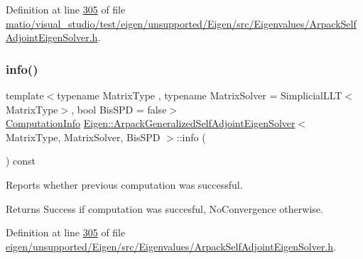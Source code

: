 Definition at line \hyperlink{matio_2visual__studio_2test_2eigen_2unsupported_2_eigen_2src_2_eigenvalues_2_arpack_self_adjoint_eigen_solver_8h_source_l00305}{305} of file \hyperlink{matio_2visual__studio_2test_2eigen_2unsupported_2_eigen_2src_2_eigenvalues_2_arpack_self_adjoint_eigen_solver_8h_source}{matio/visual\+\_\+studio/test/eigen/unsupported/\+Eigen/src/\+Eigenvalues/\+Arpack\+Self\+Adjoint\+Eigen\+Solver.\+h}.

\mbox{\label{class_eigen_1_1_arpack_generalized_self_adjoint_eigen_solver_a6f952eed50efe01b8cb91726e6a93b68}} 
\subsubsection{\texorpdfstring{info()}{info()}\hspace{0.1cm}{\footnotesize\ttfamily [2/2]}}
{\footnotesize\ttfamily template$<$typename Matrix\+Type , typename Matrix\+Solver  = Simplicial\+L\+L\+T$<$\+Matrix\+Type$>$, bool Bis\+S\+PD = false$>$ \\
\hyperlink{group__enums_ga85fad7b87587764e5cf6b513a9e0ee5e}{Computation\+Info} \hyperlink{class_eigen_1_1_arpack_generalized_self_adjoint_eigen_solver}{Eigen\+::\+Arpack\+Generalized\+Self\+Adjoint\+Eigen\+Solver}$<$ Matrix\+Type, Matrix\+Solver, Bis\+S\+PD $>$\+::info (\begin{DoxyParamCaption}{ }\end{DoxyParamCaption}) const\hspace{0.3cm}{\ttfamily [inline]}}



Reports whether previous computation was successful. 

\begin{DoxyReturn}{Returns}
{\ttfamily Success} if computation was succesful, {\ttfamily No\+Convergence} otherwise. 
\end{DoxyReturn}


Definition at line \hyperlink{eigen_2unsupported_2_eigen_2src_2_eigenvalues_2_arpack_self_adjoint_eigen_solver_8h_source_l00305}{305} of file \hyperlink{eigen_2unsupported_2_eigen_2src_2_eigenvalues_2_arpack_self_adjoint_eigen_solver_8h_source}{eigen/unsupported/\+Eigen/src/\+Eigenvalues/\+Arpack\+Self\+Adjoint\+Eigen\+Solver.\+h}.

